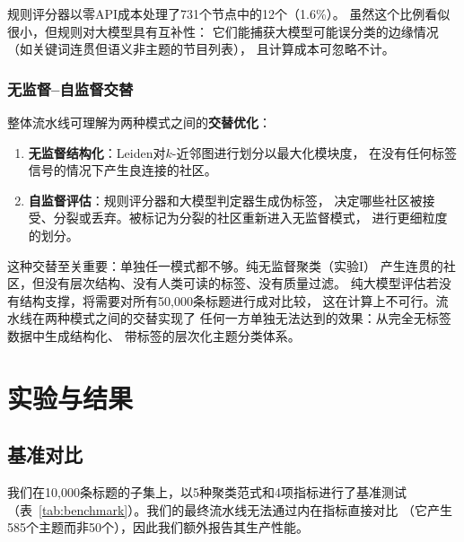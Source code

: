 \documentclass[10pt,twocolumn,twoside]{ctexart}
\begin{document}
规则评分器以零API成本处理了731个节点中的12个（1.6\%）。
虽然这个比例看似很小，但规则对大模型具有互补性：
它们能捕获大模型可能误分类的边缘情况（如关键词连贯但语义非主题的节目列表），
且计算成本可忽略不计。

\subsubsection{无监督--自监督交替}

整体流水线可理解为两种模式之间的\textbf{交替优化}：

\begin{enumerate}[nosep]
    \item \textbf{无监督结构化}：Leiden对$k$-近邻图进行划分以最大化模块度，
    在没有任何标签信号的情况下产生良连接的社区。
    \item \textbf{自监督评估}：规则评分器和大模型判定器生成伪标签，
    决定哪些社区被接受、分裂或丢弃。被标记为分裂的社区重新进入无监督模式，
    进行更细粒度的划分。
\end{enumerate}

这种交替至关重要：单独任一模式都不够。纯无监督聚类（实验I）
产生连贯的社区，但没有层次结构、没有人类可读的标签、没有质量过滤。
纯大模型评估若没有结构支撑，将需要对所有50,000条标题进行成对比较，
这在计算上不可行。流水线在两种模式之间的交替实现了
任何一方单独无法达到的效果：从完全无标签数据中生成结构化、
带标签的层次化主题分类体系。

\section{实验与结果}

\subsection{基准对比}
我们在10,000条标题的子集上，以5种聚类范式和4项指标进行了基准测试
（表~\ref{tab:benchmark}）。我们的最终流水线无法通过内在指标直接对比
（它产生585个主题而非50个），因此我们额外报告其生产性能。
\end{document}

